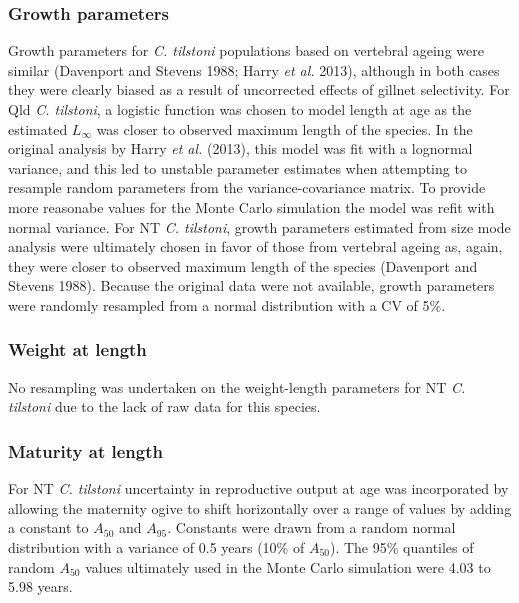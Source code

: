 \documentclass[]{article}
\begin{document}
\hypertarget{growth-parameters}{%
\subsubsection{Growth parameters}\label{growth-parameters}}

Growth parameters for \emph{C. tilstoni} populations based on vertebral
ageing were similar (Davenport and Stevens 1988; Harry \emph{et al.}
2013), although in both cases they were clearly biased as a result of
uncorrected effects of gillnet selectivity. For Qld \emph{C. tilstoni},
a logistic function was chosen to model length at age as the estimated
\(L_\infty\) was closer to observed maximum length of the species. In
the original analysis by Harry \emph{et al.} (2013), this model was fit
with a lognormal variance, and this led to unstable parameter estimates
when attempting to resample random parameters from the
variance-covariance matrix. To provide more reasonabe values for the
Monte Carlo simulation the model was refit with normal variance. For NT
\emph{C. tilstoni}, growth parameters estimated from size mode analysis
were ultimately chosen in favor of those from vertebral ageing as,
again, they were closer to observed maximum length of the species
(Davenport and Stevens 1988). Because the original data were not
available, growth parameters were randomly resampled from a normal
distribution with a CV of 5\%.

\hypertarget{weight-at-length}{%
\subsubsection{Weight at length}\label{weight-at-length}}

No resampling was undertaken on the weight-length parameters for NT
\emph{C. tilstoni} due to the lack of raw data for this species.

\hypertarget{maturity-at-length}{%
\subsubsection{Maturity at length}\label{maturity-at-length}}

For NT \emph{C. tilstoni} uncertainty in reproductive output at age was
incorporated by allowing the maternity ogive to shift horizontally over
a range of values by adding a constant to \(A_{50}\) and \(A_{95}\).
Constants were drawn from a random normal distribution with a variance
of 0.5 years (10\% of \(A_{50}\)). The 95\% quantiles of random
\(A_{50}\) values ultimately used in the Monte Carlo simulation were
4.03 to 5.98 years.
\end{document}
